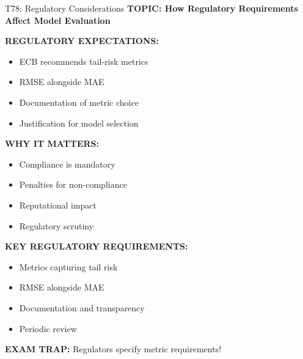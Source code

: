 \documentclass[8pt]{beamer}
\begin{document}
	\begin{frame}{T78: Regulatory Considerations}
		\fontsize{6.5}{7.5}\selectfont
		\textbf{TOPIC: How Regulatory Requirements Affect Model Evaluation}
		
		\vspace{0.1cm}
		\textbf{REGULATORY EXPECTATIONS:}
		\begin{itemize}
			\item ECB recommends tail-risk metrics
			\item RMSE alongside MAE
			\item Documentation of metric choice
			\item Justification for model selection
		\end{itemize}
		
		\vspace{0.1cm}
		\textbf{WHY IT MATTERS:}
		\begin{itemize}
			\item Compliance is mandatory
			\item Penalties for non-compliance
			\item Reputational impact
			\item Regulatory scrutiny
		\end{itemize}
		
		\vspace{0.1cm}
		\textbf{KEY REGULATORY REQUIREMENTS:}
		\begin{itemize}
			\item Metrics capturing tail risk
			\item RMSE alongside MAE
			\item Documentation and transparency
			\item Periodic review
		\end{itemize}
		
		\textcolor{myred}{\textbf{EXAM TRAP:}} Regulators \textcolor{myblue}{specify metric requirements}!
	\end{frame}
	
\end{document}
